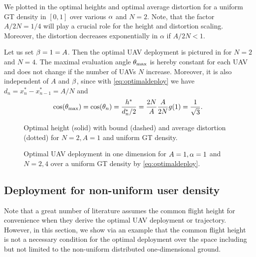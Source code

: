 \documentclass[smallabstract,smallcaptions]{dccpaper}
\newcounter{example}[section]
\newenvironment{example}[1][]{\refstepcounter{example}\par\vspace{1.5ex}\noindent{\em Example~\theexample. #1}}{\par\vspace{1.5ex}}
\newcommand{\junstart}{\color{black}}
\begin{document}
\begin{example}
We plotted in  the optimal heights and optimal average distortion for a uniform GT density in
$[0,1]$ over various $\alpha$ and $N=2$. Note, that the factor $A/2N=1/4$ will play a crucial role for the height and
distortion scaling. Moreover, the distortion decreases exponentially in $\alpha$ if $A/2N<1$.

Let us set $\beta=1=A$. Then the optimal UAV deployment is pictured in  for $N=2$ and $N=4$. The
maximal evaluation angle $\theta_{\text{max}}$ is hereby constant for each UAV and does not change if the number of UAVs
$N$ increase.
Moreover, it is also independent of $A$ and $\beta$, since with \eqref{eq:optimaldeploy} we have
$d_n=x^*_n-x^*_{n-1}=A/N$ and
%
\begin{align}
  \cos(\theta_{\text{max}})=\cos(\theta_n)= \frac{h^*}{d^*_n/2}= \frac{2N}{A}\frac{A}{2N}   g(1)= \frac{1}{\sqrt{3}}.
\end{align}
\end{example}
% 
\begin{figure}
\begin{minipage}[b]{0.4\textwidth}
  \vspace{1ex}
\def\svgwidth{1.1\textwidth} \scriptsize{
  }
  \vspace{-3.2ex}
  \caption{{\small Optimal height (solid) with bound (dashed) and average distortion (dotted) for $N=2,A=1$ and uniform GT density.}}
  \label{fig:goptdopt}
\end{minipage}
\hfill
  \begin{minipage}[b]{0.56\textwidth}
\hspace{-2ex} 
    \def\svgwidth{1.1\textwidth} \scriptsize{
      }
      \caption{{\small Optimal UAV deployment in one dimension for $A=1,\alpha=1$ and $N=2,4$ over a uniform GT density
      by \eqref{eq:optimaldeploy}.}}
      \label{fig:uavonedim}
    \end{minipage}
\end{figure}
%


\junstart
{} %
\subsection{Deployment for non-uniform user density}
%
Note that a great number of literature assumes the common flight height for convenience when they derive the optimal UAV
deployment or trajectory.  However, in this section, we show via an example that the common flight height is not a
necessary condition for the optimal deployment over the space including but not limited to the non-uniform distributed
one-dimensional ground.
\fi %
\end{document}
